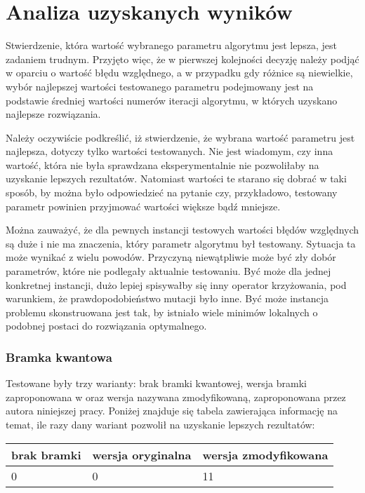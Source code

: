 \chapter{Analiza uzyskanych wyników}
\label{cha:analiza}

Stwierdzenie, która wartość wybranego parametru algorytmu jest lepsza, jest zadaniem trudnym. Przyjęto więc, że w pierwszej kolejności decyzję należy podjąć w oparciu o wartość błędu względnego, a w przypadku gdy różnice są niewielkie, wybór najlepszej wartości testowanego parametru podejmowany jest na podstawie średniej wartości numerów iteracji algorytmu, w których uzyskano najlepsze rozwiązania.

Należy oczywiście podkreślić, iż stwierdzenie, że wybrana wartość parametru jest najlepsza, dotyczy tylko wartości testowanych. Nie jest wiadomym, czy inna wartość, która nie była sprawdzana eksperymentalnie nie pozwoliłaby na uzyskanie lepszych rezultatów. Natomiast wartości te starano się dobrać w taki sposób, by można było odpowiedzieć na pytanie czy, przykładowo, testowany parametr powinien przyjmować wartości większe bądź mniejsze.

Można zauważyć, że dla pewnych instancji testowych wartości błędów względnych są duże i nie ma znaczenia, który parametr algorytmu był testowany. Sytuacja ta może wynikać z wielu powodów. Przyczyną niewątpliwie może być zły dobór parametrów, które nie podlegały aktualnie testowaniu. Być może dla jednej konkretnej instancji, dużo lepiej spisywałby się inny operator krzyżowania, pod warunkiem, że prawdopodobieństwo mutacji było inne. Być może instancja problemu skonstruowana jest tak, by istniało wiele minimów lokalnych o podobnej postaci do rozwiązania optymalnego.

\subsection{Bramka kwantowa}
Testowane były trzy warianty: brak bramki kwantowej, wersja bramki zaproponowana w \cite{NPQGA} oraz wersja nazywana zmodyfikowaną, zaproponowana przez autora niniejszej pracy. Poniżej znajduje się tabela zawierająca informację na temat, ile razy dany wariant pozwolił na uzyskanie lepszych rezultatów:

\begin{table}[H]
\label{bramka_results}
\begin{tabular}{l l l}
\hline
brak bramki & wersja oryginalna & wersja zmodyfikowana \\
\hline
0 & 0 & 11\\
\hline
\end{tabular}
\end{table}

